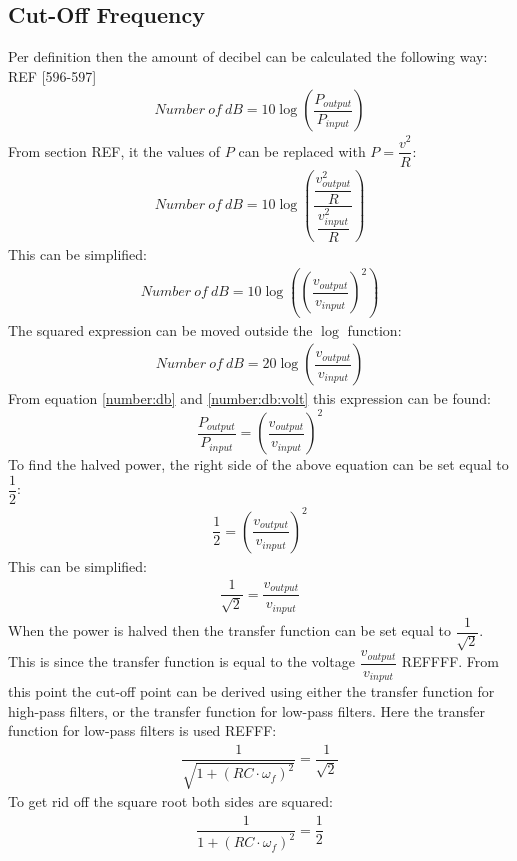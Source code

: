 \subsection{Cut-Off Frequency}
Per definition then the amount of decibel can be calculated the following way: REF [596-597]
\begin{align} \label{number:db}
Number \ of \ dB = 10 \log \left(\dfrac{P_{output}}{P_{input}} \right)
\end{align}
From section REF, it the values of $P$ can be replaced with $P=\dfrac{v^2}{R}$:
\begin{align*}
Number \ of \ dB = 10 \log \left(\dfrac{\dfrac{v_{output}^2}{R}}{\dfrac{v_{input}^2}{R}} \right)
\end{align*}
This can be simplified:
\begin{align} \label{number:db:volt}
Number \ of \ dB = 10 \log \left(\left(\dfrac{v_{output}}{v_{input}} \right)^2\right)
\end{align}
The squared expression can be moved outside the $\log$ function:
\begin{align*}
Number \ of \ dB = 20 \log \left(\dfrac{v_{output}}{v_{input}}\right)
\end{align*}
From equation \ref{number:db} and \ref{number:db:volt} this expression can be found: $$\dfrac{P_{output}}{P_{input}}= \left(\dfrac{v_{output}}{v_{input}} \right)^2$$ To find the halved power, the right side of the above equation can be set equal to $\dfrac{1}{2}$:
\begin{align*}
\dfrac{1}{2}= \left(\dfrac{v_{output}}{v_{input}} \right)^2
\end{align*}
This can be simplified:
\begin{align*}
\dfrac{1}{\sqrt{2}}= \dfrac{v_{output}}{v_{input}}
\end{align*}
When the power is halved then the transfer function can be set equal to $\dfrac{1}{\sqrt{2}}$. This is since the transfer function is equal to the voltage $\dfrac{v_{output}}{v_{input}}$ REFFFF. From this point the cut-off point can be derived using either the transfer function for high-pass filters, or the transfer function for low-pass filters. Here the transfer function for low-pass filters is used REFFF:
\begin{align*}
\dfrac{1}{\sqrt{1+ \left(RC \cdot \omega_f \right)^2}} = \dfrac{1}{\sqrt{2}}
\end{align*}
To get rid off the square root both sides are squared:
\begin{align*}
\dfrac{1}{1+ \left(RC \cdot \omega_f \right)^2} = \dfrac{1}{2}
\end{align*}
